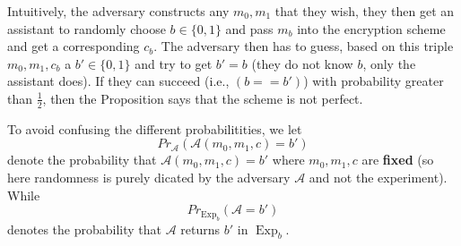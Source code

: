 \documentclass[twoside, a4paper, 10pt]{amsart}
\begin{document}
Intuitively, the adversary constructs any $m_0,m_1$ that they wish, they then get an assistant to randomly choose $b \in \{0,1\}$ and pass $m_b$ into the encryption scheme and get a corresponding $c_b$. The adversary then has to guess, based on this triple $m_0, m_1, c_b$ a $b' \in \{0,1\}$ and try to get $b' = b$ (they do not know $b$, only the assistant does). If they can succeed (i.e., $(b == b')$) with probability greater than $\frac{1}{2}$, then the Proposition says that the scheme is not perfect.

To avoid confusing the different probabilitities, we let $$Pr_{\mathcal{A}}(\mathcal{A}(m_0,m_1, c) = b')$$ denote the probability that $\mathcal{A}(m_0,m_1,c) = b'$ where $m_0,m_1,c$ are \textbf{fixed} (so here randomness is purely dicated by the adversary $\mathcal{A}$ and not the experiment). While $$Pr_{\operatorname{Exp}_b} (\mathcal{A} = b')$$ denotes the probability that $\mathcal{A}$ returns $b'$ in $\operatorname{Exp}_b$.
\end{document}
